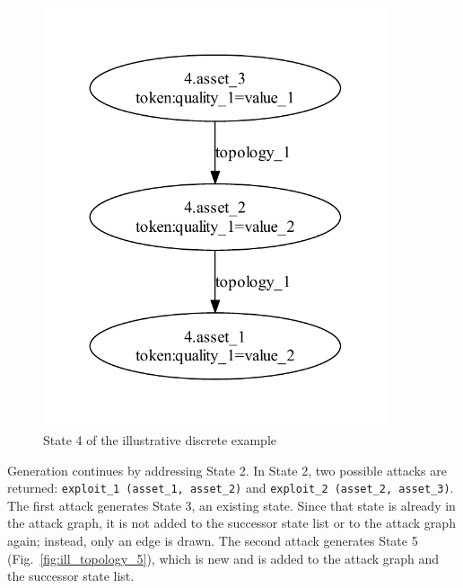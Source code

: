 \begin{figure}
\includegraphics[width=4in]{ag_illustrative_simple/nm_state4}
\caption{State 4 of the illustrative discrete example}
\label{fig:ill_topology_4}
\end{figure}

Generation continues by addressing State 2. In State 2, two possible attacks
are returned: \texttt{exploit\_1 (asset\_1, asset\_2)} and 
\texttt{exploit\_2 (asset\_2, asset\_3)}. The first attack generates State 3,
an existing state. Since that state is already in the attack graph, it is
not added to the successor state list or to the attack graph again; instead,
only an edge is drawn. The second attack generates State 5 
(Fig.~\ref{fig:ill_topology_5}), which is new and is added to the attack graph
and the successor state list.

